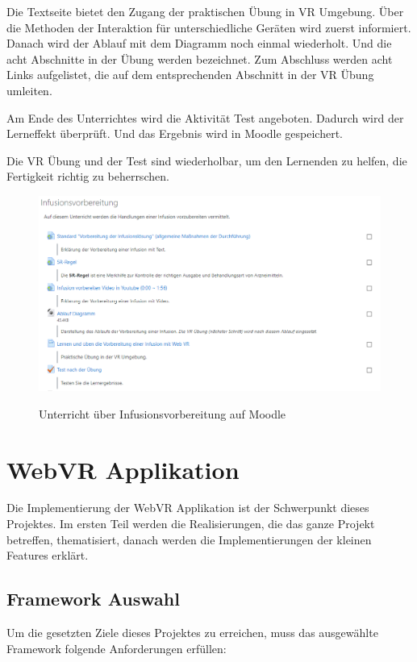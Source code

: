  Die Textseite bietet den Zugang der praktischen Übung in VR Umgebung. Über die Methoden der Interaktion für unterschiedliche Geräten wird zuerst informiert. Danach wird der Ablauf mit dem Diagramm noch einmal wiederholt. Und die acht Abschnitte in der Übung werden bezeichnet. Zum Abschluss werden acht Links aufgelistet, die auf dem entsprechenden Abschnitt in der VR Übung umleiten.
 
 Am Ende des Unterrichtes wird die Aktivität Test angeboten. Dadurch wird der Lerneffekt überprüft. Und das Ergebnis wird in Moodle gespeichert.
 
 Die VR Übung und der Test sind wiederholbar, um den Lernenden zu helfen, die Fertigkeit richtig zu beherrschen.
 
\begin{figure}[ht]
\centering
\caption{Unterricht über Infusionsvorbereitung auf Moodle}
\includegraphics[width=\textwidth]{images/unterricht.png}
\label{fig:unterricht}
\end{figure}
 
\section{WebVR Applikation}
Die Implementierung der WebVR Applikation ist der Schwerpunkt dieses Projektes. Im ersten Teil werden die Realisierungen, die das ganze Projekt betreffen, thematisiert, danach werden die Implementierungen der kleinen Features erklärt.

 \subsection{Framework Auswahl}
 
 Um die gesetzten Ziele dieses Projektes zu erreichen, muss das ausgewählte Framework folgende Anforderungen erfüllen:
 
